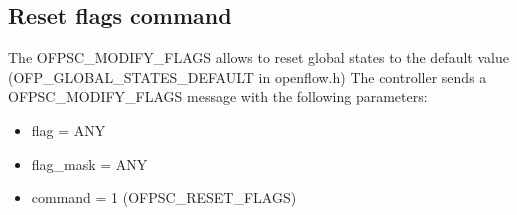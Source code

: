 \subsection{Reset flags command}
The OFPSC\_MODIFY\_FLAGS allows to reset global states to the default value (OFP\_GLOBAL\_STATES\_DEFAULT in openflow.h)
The controller sends a OFPSC\_MODIFY\_FLAGS message with the following parameters:
\begin{itemize}
\setlength\itemsep{0em}
\item flag = ANY
\item flag\_mask = ANY
\item command = 1 (OFPSC\_RESET\_FLAGS)
\end{itemize}